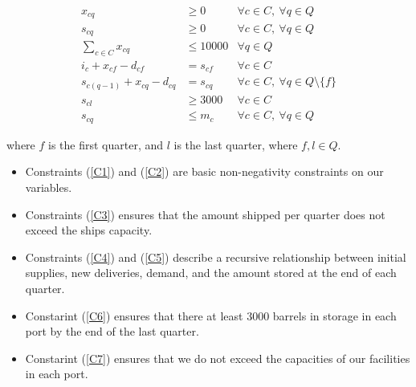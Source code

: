 \documentclass[a4paper]{article}
\begin{document}
\begin{align}
x_{cq} & \geq 0 & \forall c \in C,\  \forall q \in Q \label{C1}\\
s_{cq} & \geq 0 & \forall c \in C,\  \forall q \in Q \label{C2}\\
\sum_{c \in C} x_{cq} & \leq 10000 & \forall q \in Q \label{C3}\\
i_{c} +  x_{cf} - d_{cf} & = s_{cf} & \forall c \in C \label{C4}\\
s_{c(q - 1)} +  x_{cq} - d_{cq} & = s_{cq} & \forall c \in C,\  \forall q \in Q \setminus \{ f \} \label{C5}\\
s_{cl} & \geq 3000 & \forall c \in C \label{C6}\\
s_{cq} & \leq m_c & \forall c \in C,\  \forall q \in Q \label{C7}
\end{align}

where $f$ is the first quarter, and $l$ is the last quarter, where $f, l \in Q$.
\begin{itemize}
    \item Constraints (\ref{C1}) and (\ref{C2}) are basic non-negativity constraints on our variables. 
    \item Constraints (\ref{C3}) ensures that the amount shipped per quarter does not exceed the ships capacity.
    \item Constraints (\ref{C4}) and (\ref{C5}) describe a recursive relationship between initial supplies, new deliveries, demand, and the amount stored at the end of each quarter.
    \item Constarint (\ref{C6}) ensures that there at least 3000 barrels in storage in each port by the end of the last quarter.
    \item Constarint (\ref{C7}) ensures that we do not exceed the capacities of our facilities in each port.
\end{itemize}
\end{document}

